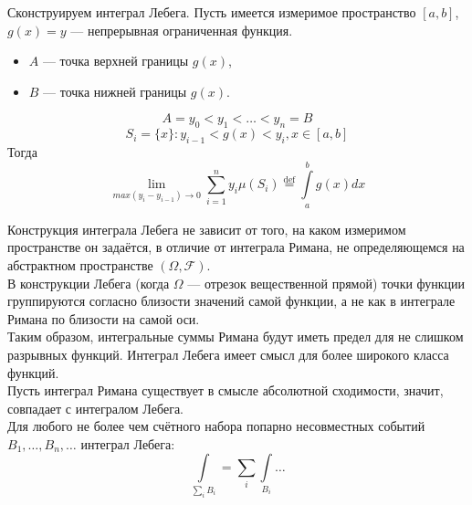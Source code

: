 \begin{interjection}
	Сконструируем интеграл Лебега. Пусть имеется измеримое пространство $[a, b]$, $g(x) = y$ --- непрерывная ограниченная функция.
	\begin{itemize}
		\item $A$ --- точка верхней границы $g(x)$,
		\item $B$ --- точка нижней границы $g(x)$.
	\end{itemize}
	\[
		A = y_0 < y_1 < \ldots < y_n = B
	\]
	\[
		S_i = \{ x \}: y_{i - 1} < g(x) < y_i, x \in [a, b]
	\]
	Тогда
	\[
		\lim\limits_{max(y_i - y_{i - 1}) \to 0} \sum\limits_{i = 1}^n y_i \mu (S_i) \overset{\textrm{def}}{=} \int\limits_a^b g(x) dx
	\]
\end{interjection}

\begin{addition}
	Конструкция интеграла Лебега не зависит от того, на каком измеримом пространстве он задаётся, в отличие от интеграла Римана, не определяющемся на абстрактном пространстве $(\Omega, \mathcal{F})$. \\
	В конструкции Лебега (когда $\Omega$ --- отрезок вещественной прямой) точки функции группируются согласно близости значений самой функции, а не как в интеграле Римана по близости на самой оси. \\
	Таким образом, интегральные суммы Римана будут иметь предел для не слишком разрывных функций. Интеграл Лебега имеет смысл для более широкого класса функций. \\
	Пусть интеграл Римана существует в смысле абсолютной сходимости, значит, совпадает с интегралом Лебега. \\
	Для любого не более чем счётного набора попарно несовместных событий $B_1, \ldots, B_n, \ldots$ интеграл Лебега:
	\[
		\int\limits_{\sum\limits_i B_i} = \sum\limits_i \int\limits_{B_i} \ldots
	\]
\end{addition}

